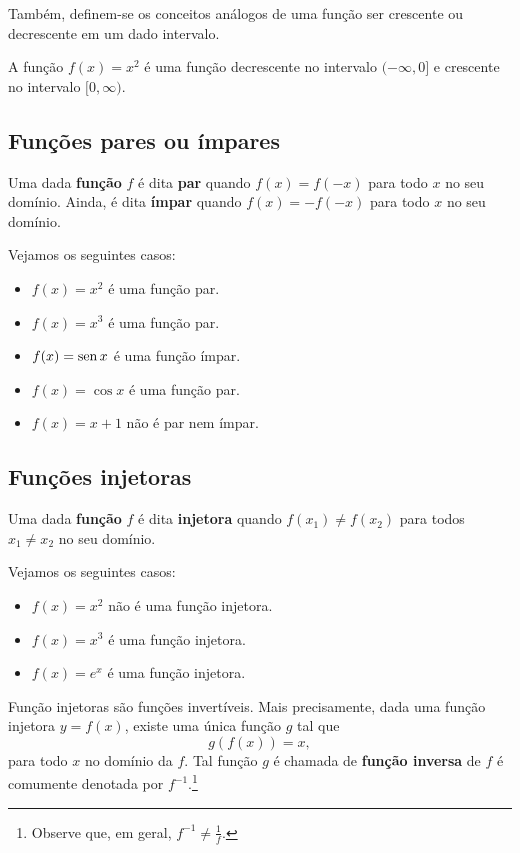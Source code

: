 Também, definem-se os conceitos análogos de uma função ser crescente ou decrescente em um dado intervalo.

\begin{ex}
  A função $f(x) = x^2$ é uma função decrescente no intervalo $(-\infty, 0]$ e crescente no intervalo $[0, \infty)$.
\end{ex}

\subsection{Funções pares ou ímpares}

Uma dada {\bf função} $f$ é dita {\bf par} quando $f(x)=f(-x)$ para todo $x$ no seu domínio. Ainda, é dita {\bf ímpar} quando $f(x)=-f(-x)$ para todo $x$ no seu domínio.

\begin{ex}
  Vejamos os seguintes casos:
  \begin{itemize}
  \item $f(x) = x^2$ é uma função par.
  \item $f(x) = x^3$ é uma função par.
  \item $f(x) = \operatorname{sen} x$ é uma função ímpar.
  \item $f(x) = \cos x$ é uma função par.
  \item $f(x) = x+1$ não é par nem ímpar.
  \end{itemize}
\end{ex}

\subsection{Funções injetoras}

Uma dada {\bf função} $f$ é dita {\bf injetora} quando $f(x_1)\neq f(x_2)$ para todos $x_1\neq x_2$ no seu domínio.

\begin{ex}
  Vejamos os seguintes casos:
  \begin{itemize}
  \item $f(x) = x^2$ não é uma função injetora.
  \item $f(x) = x^3$ é uma função injetora.
  \item $f(x) = e^x$ é uma função injetora.
  \end{itemize}
\end{ex}

Função injetoras são funções invertíveis. Mais precisamente, dada uma função injetora $y = f(x)$, existe uma única função $g$ tal que
\begin{equation}
  g(f(x)) = x,
\end{equation}
para todo $x$ no domínio da $f$. Tal função $g$ é chamada de {\bf função inversa} de $f$ é comumente denotada por $f^{-1}$.\footnote{Observe que, em geral, $f^{-1} \neq \frac{1}{f}$.}


